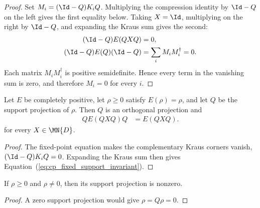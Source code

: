 \begin{proof}
    \leanok
    Set $M_i=(\Id-Q)K_iQ$. Multiplying the compression identity by $\Id-Q$
    on the left gives the first equality below. Taking $X=\Id$, multiplying on
    the right by $\Id-Q$, and expanding the Kraus sum gives the second:
    \begin{align}
        (\Id-Q)E(QXQ)
         & =0,
        \notag\\
        (\Id-Q)E(Q)(\Id-Q)
         & =\sum_i M_iM_i^\dagger=0.
        \notag
    \end{align}
    Each matrix $M_iM_i^\dagger$ is positive semidefinite. Hence every term in
    the vanishing sum is zero, and therefore $M_i=0$ for every $i$.
\end{proof}

\begin{theorem}
    \label{thm:cp_fixed_support_invariant}
    \leanok
    Let $E$ be completely positive, let $\rho\geq0$ satisfy $E(\rho)=\rho$,
    and let $Q$ be the support projection of $\rho$. Then $Q$ is an
    orthogonal projection and
    \begin{align}
        QE(QXQ)Q
         & =E(QXQ).
        \label{eq:cp_fixed_support_invariant}
    \end{align}
    for every $X\in\MN{D}$.
\end{theorem}

\begin{proof}
    \leanok
    The fixed-point equation makes the complementary Kraus corners vanish,
    $(\Id-Q)K_iQ=0$. Expanding the Kraus sum then gives
    Equation~(\ref{eq:cp_fixed_support_invariant}).
\end{proof}

\begin{theorem}
    \label{thm:nonzero_psd_support}
    \leanok
    If $\rho\geq0$ and $\rho\neq0$, then its support projection is nonzero.
\end{theorem}

\begin{proof}
    \leanok
    A zero support projection would give $\rho=Q\rho=0$.
\end{proof}

